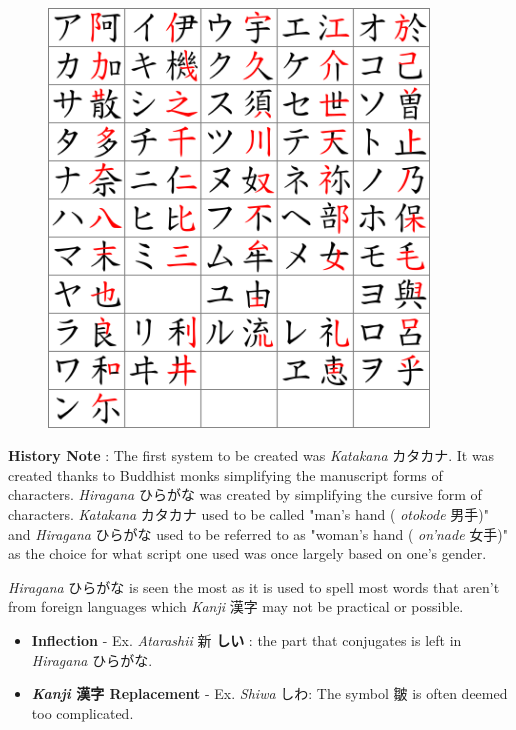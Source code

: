 \begin{figure}[h]
\centering

\includegraphics[width=0.9\textwidth]{figs/第01章/第7課:_10majoraspects_fig/Katakana_Origins.png}

\end{figure}

\par{\textbf{History Note }: The first system to be created was \emph{Katakana }カタカナ. It was created thanks to Buddhist monks simplifying the manuscript forms of characters. \emph{Hiragana }ひらがな was created by simplifying the cursive form of characters. \emph{Katakana }カタカナ used to be called "man's hand ( \emph{otokode }男手)" and \emph{Hiragana }ひらがな used to be referred to as "woman's hand ( \emph{on'nade }女手)" as the choice for what script one used was once largely based on one's gender. }

\par{ \emph{Hiragana }ひらがな is seen the most as it is used to spell most words that aren't from foreign languages which \emph{Kanji }漢字 may not be practical or possible. }

\begin{itemize}

\item \textbf{Inflection }- Ex. \emph{Atarashii }新 \textbf{しい }: the part that conjugates is left in \emph{Hiragana }ひらがな. 
\item \textbf{\emph{Kanji }漢字 Replacement }- Ex. \emph{Shiwa }しわ: The symbol 皺 is often deemed too complicated. 
\end{itemize}


